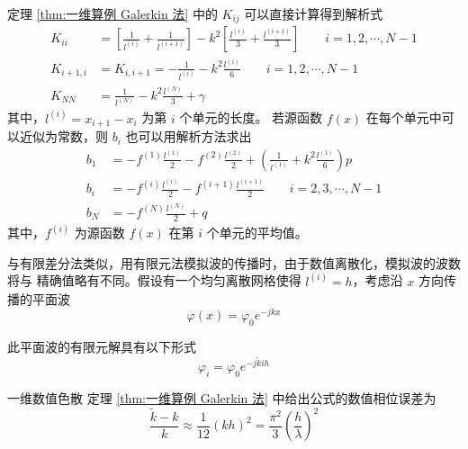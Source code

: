 \begin{theorem}
    定理 \ref{thm:一维算例 Galerkin 法} 中的 $K_{ij}$
    可以直接计算得到解析式
    \begin{align}
        K_{ii}&=
        \left[
            \frac{1}{l^{(i)}}+\frac{1}{l^{(i+1)}}    
        \right]
        -k^2\left[
            \frac{l^{(i)}}{3}+\frac{l^{(i+1)}}{3}
        \right]
        \qquad i=1,2,\cdots,N-1\\
        K_{i+1,i}&=K_{i,i+1}=
        -\frac{1}{l^{(i)}}-k^2\frac{l^{(i)}}{6}
        \qquad i=1,2,\cdots,N-1\\
        K_{NN}&=\frac{1}{l^{(N)}}-k^2\frac{l^{(N)}}{3}
        +\gamma
    \end{align}
    其中，$l^{(i)}=x_{i+1}-x_i$ 为第 $i$ 个单元的长度。
    若源函数 $f(x)$ 在每个单元中可以近似为常数，则
    $b_i$ 也可以用解析方法求出
    \begin{align}
        b_1&=-f^{(1)}\frac{l^{(1)}}{2}
        -f^{(2)}\frac{l^{(2)}}{2}
        +\left(
            \frac{1}{l^{(1)}}+k^2\frac{l^{(1)}}{6}
        \right)p\\
        b_i&=-f^{(i)}\frac{l^{(i)}}{2}
        -f^{(i+1)}\frac{l^{(i+1)}}{2}\qquad i=2,3,\cdots,N-1\\
        b_N&=-f^{(N)}\frac{l^{(N)}}{2}+q
    \end{align}
    其中，$f^{(i)}$ 为源函数 $f(x)$ 在第 $i$ 个单元的平均值。
\end{theorem}

\par 与有限差分法类似，用有限元法模拟波的传播时，由于数值离散化，模拟波的波数将与
精确值略有不同。假设有一个均匀离散网格使得 $l^{(i)}=h$，考虑沿 $x$ 方向传播的平面波
\begin{equation}
    \varphi(x) = \varphi_0e^{-jkx}
\end{equation}
\par 此平面波的有限元解具有以下形式
\begin{equation}
    \varphi_i = \varphi_0e^{-j\tilde{k}ih}
    \label{一维有限元解}
\end{equation}

\begin{theorem}{一维数值色散}
    定理 \ref{thm:一维算例 Galerkin 法} 中给出公式的数值相位误差为
    \begin{equation}
        \frac{\tilde{k}-k}{k}
        \approx\frac{1}{12}(kh)^2
        =\frac{\pi^2}{3}\left(\frac{h}{\lambda}\right)^2
    \end{equation}
\end{theorem}


